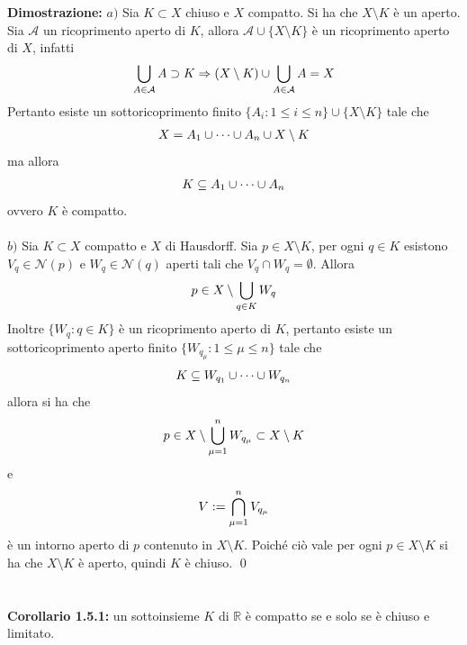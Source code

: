 \documentclass{article}
\begin{document}
\textbf{Dimostrazione:} $a)$ Sia $K \subset X$ chiuso e $X$ compatto. Si ha che $X \setminus K$ è un aperto. Sia $\mathcal{A}$ un ricoprimento aperto di $K$, allora $\mathcal{A} \cup \{X \setminus K\}$ è un ricoprimento aperto di $X$, infatti
\begin{gather}
    \bigcup_{A \in \mathcal{A}} A \supset K \Rightarrow (X \setminus K) \cup \bigcup_{A \in \mathcal{A}} A = X \notag
\end{gather}
Pertanto esiste un sottoricoprimento finito $\{A_i : 1 \leq i \leq n \} \cup \{ X \setminus K \}$ tale che
\begin{gather}
    X = A_1 \cup \dots \cup A_n \cup X \setminus K \notag
\end{gather}
ma allora
\begin{gather}
    K \subseteq A_1 \cup \dots \cup A_n \notag
\end{gather}
ovvero $K$ è compatto. \\ \\
$b)$ Sia $K \subset X$ compatto e $X$ di Hausdorff. Sia $p \in X \setminus K$, per ogni $q \in K$ esistono $V_q \in \mathcal{N}(p)$ e $W_q \in \mathcal{N}(q)$ aperti tali che $V_q \cap W_q = \emptyset$. Allora
\begin{gather}
    p \in X \setminus \bigcup_{q \in K} W_q \notag
\end{gather}
Inoltre $\{ W_q : q \in K \}$ è un ricoprimento aperto di $K$, pertanto esiste un sottoricoprimento aperto finito $\{ W_{q_\mu} : 1 \leq \mu \leq n \}$ tale che
\begin{gather}
    K \subseteq W_{q_1} \cup \dots \cup W_{q_n} \notag
\end{gather}
allora si ha che
\begin{gather}
    p \in X \setminus \bigcup_{\mu = 1}^n W_{q_\mu} \subset X \setminus K \notag
\end{gather}
e
\begin{gather}
    V := \bigcap_{\mu = 1}^n V_{q_\mu} \notag
\end{gather}
è un intorno aperto di $p$ contenuto in $X \setminus K$. Poiché ciò vale per ogni $p \in X \setminus K$ si ha che $X \setminus K$ è aperto, quindi $K$ è chiuso. \qed \\ \\ \\
\textbf{Corollario 1.5.1:} un sottoinsieme $K$ di $\mathbb{R}$ è compatto se e solo se è chiuso e limitato. \\
\end{document}
